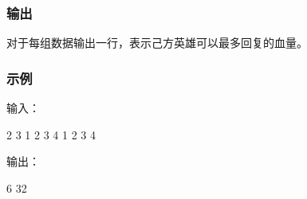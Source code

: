\subsubsection{输出}
对于每组数据输出一行，表示己方英雄可以最多回复的血量。

\subsubsection{示例}
输入：
\begin{lstlistings}
2
3
1 2 3
4
1 2 3 4
\end{lstlistings}

输出：
\begin{lstlistings}
6
32
\end{lstlistings}
